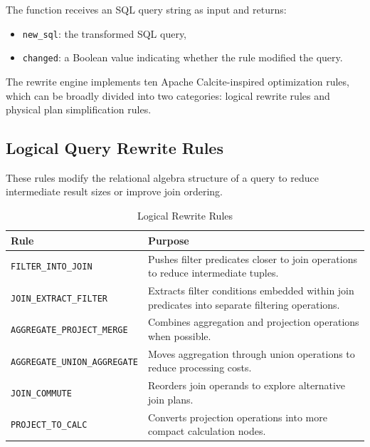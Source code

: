 \documentclass[12pt,a4paper]{article}
\begin{document}
The function receives an SQL query string as input and returns:

\begin{itemize}
    \item \texttt{new\_sql}: the transformed SQL query,
    \item \texttt{changed}: a Boolean value indicating whether the rule modified the query.
\end{itemize}

The rewrite engine implements ten Apache Calcite-inspired optimization rules, which can be broadly divided into two categories: logical rewrite rules and physical plan simplification rules.

\newpage

\subsection{Logical Query Rewrite Rules}

These rules modify the relational algebra structure of a query to reduce intermediate result sizes or improve join ordering.

\begin{table}[h]
\centering
\caption{Logical Rewrite Rules}
\begin{tabular}{|l|p{8cm}|}
\hline
\textbf{Rule} & \textbf{Purpose} \\
\hline
\texttt{FILTER\_INTO\_JOIN} &
Pushes filter predicates closer to join operations to reduce intermediate tuples. \\
\hline

\texttt{JOIN\_EXTRACT\_FILTER} &
Extracts filter conditions embedded within join predicates into separate filtering operations. \\
\hline

\texttt{AGGREGATE\_PROJECT\_MERGE} &
Combines aggregation and projection operations when possible. \\
\hline

\texttt{AGGREGATE\_UNION\_AGGREGATE} &
Moves aggregation through union operations to reduce processing costs. \\
\hline

\texttt{JOIN\_COMMUTE} &
Reorders join operands to explore alternative join plans. \\
\hline

\texttt{PROJECT\_TO\_CALC} &
Converts projection operations into more compact calculation nodes. \\
\hline
\end{tabular}
\end{table}
\end{document}
